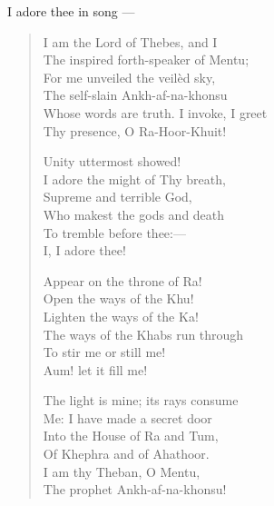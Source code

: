 \label{adoration}
I adore thee in song ---
\begin{center}
\begin{verse}
  I am the Lord of Thebes, and I \\
  \hspace{1em} The inspired forth-speaker of Mentu; \\
  For me unveiled the veil\`{e}d sky, \\
  \hspace{1em} The self-slain Ankh-af-na-khonsu \\
  Whose words are truth. I invoke, I greet \\
  \hspace{1em} Thy presence, O Ra-Hoor-Khuit!

  Unity uttermost showed! \\
  \hspace{1em} I adore the might of Thy breath, \\
  Supreme and terrible God, \\
  \hspace{1em} Who makest the gods and death \\
  To tremble before thee:--- \\
  \hspace{1em} I, I adore thee!

  Appear on the throne of Ra! \\
  \hspace{1em} Open the ways of the Khu! \\
  Lighten the ways of the Ka! \\
  \hspace{1em} The ways of the Khabs run through \\
  To stir me or still me! \\
  \hspace{1em} Aum! let it fill me!

  The light is mine; its rays consume \\
  \hspace{1em} Me: I have made a secret door \\
  Into the House of Ra and Tum, \\
  \hspace{1em} Of Khephra and of Ahathoor. \\
  I am thy Theban, O Mentu, \\
  \hspace{1em} The prophet Ankh-af-na-khonsu!


\end{verse}
\end{center}
